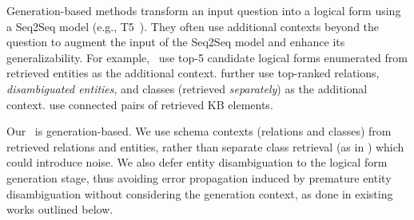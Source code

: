 Generation-based methods transform an input question into a logical form using a Seq2Seq model (e.g., T5~\cite{raffel_exploring_2023}).
They often use additional contexts beyond the question to augment the input of the Seq2Seq model and enhance its generalizability. For example,~\citet{ye_rng-kbqa_2022} use  top-5 candidate logical forms enumerated from retrieved entities as the additional context. 
\citet{shu_tiara_2022} further use top-ranked relations, \emph{disambiguated entities}, and classes (retrieved \emph{separately}) as the additional context. \citet{zhang_fc-kbqa_2023} use connected pairs of retrieved KB elements. 

Our \model\ is generation-based. We use schema contexts (relations and classes) from retrieved relations and entities, rather than separate class retrieval (as in \citet{shu_tiara_2022}) which could introduce noise. We also defer entity disambiguation to the logical form generation stage, thus avoiding error propagation induced by premature entity disambiguation without considering the generation context, as done in existing works outlined below. 








